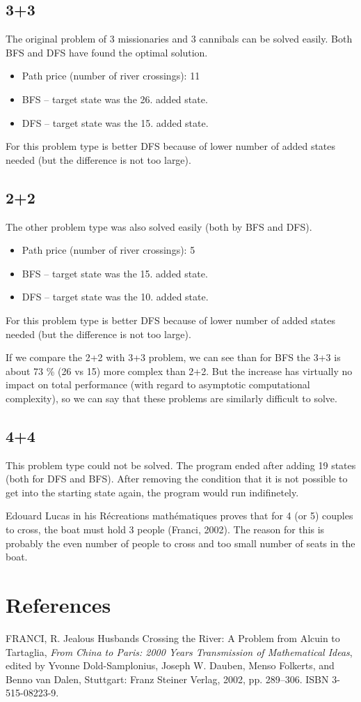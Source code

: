 \documentclass{article}
\begin{document}
\subsection{3+3}
The original problem of 3 missionaries and 3 cannibals can be solved easily. Both BFS and DFS have found the optimal solution.
\begin{itemize}
\item Path price (number of river crossings): 11
\item BFS -- target state was the 26. added state.
\item DFS -- target state was the 15. added state.
\end{itemize}
For this problem type is better DFS because of lower number of added states needed (but the difference is not too large).

\subsection{2+2}
The other problem type was also solved easily (both by BFS and DFS).
\begin{itemize}
\item Path price (number of river crossings): 5
\item BFS -- target state was the 15. added state.
\item DFS -- target state was the 10. added state.
\end{itemize}
For this problem type is better DFS because of lower number of added states needed (but the difference is not too large). 

If we compare the 2+2 with 3+3 problem, we can see than for BFS the 3+3 is about 73 \% (26 vs 15) more complex than 2+2. But the increase has virtually no impact on total performance (with regard to asymptotic computational complexity), so we can say that these problems are similarly difficult to solve. 

\subsection{4+4}
This problem type could not be solved. The program ended after adding 19 states (both for DFS and BFS). After removing the condition that it is not possible to get into the starting state again, the program would run indifinetely. 

Edouard Lucas in his Récreations mathématiques proves that for 4 (or 5) couples to cross, the boat must hold 3 people (Franci, 2002). The reason for this is probably the even number of people to cross and too small number of seats in the boat.

\section{References}

FRANCI, R. Jealous Husbands Crossing the River: A Problem from Alcuin to Tartaglia, \textit{From China to Paris: 2000 Years Transmission of Mathematical Ideas}, edited by Yvonne Dold-Samplonius, Joseph W. Dauben, Menso Folkerts, and Benno van Dalen, Stuttgart: Franz Steiner Verlag, 2002, pp. 289–306. ISBN 3-515-08223-9.
\end{document}
